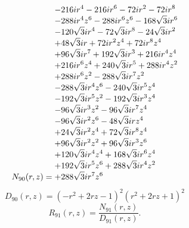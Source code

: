 \documentclass[11pt,a4paper]{article}
\begin{document}
\begin{equation}
N_{90}(r,z)=\shortstack[l]{$\displaystyle  - 216 i r^{4} - 216 i r^{6} - 72 i r^{2} - 72 i r^{8}$\\
$\displaystyle  - 288 i r^{4} z^{6} - 288 i r^{6} z^{6} - 168 \sqrt{3} i r^{6}$\\
$\displaystyle  - 120 \sqrt{3} i r^{4} - 72 \sqrt{3} i r^{8} - 24 \sqrt{3} i r^{2}$\\
$\displaystyle  + 48 \sqrt{3} i r + 72 i r^{2} z^{4} + 72 i r^{8} z^{4}$\\
$\displaystyle  + 96 \sqrt{3} i r^{7} + 192 \sqrt{3} i r^{3} + 216 i r^{4} z^{4}$\\
$\displaystyle  + 216 i r^{6} z^{4} + 240 \sqrt{3} i r^{5} + 288 i r^{4} z^{2}$\\
$\displaystyle  + 288 i r^{6} z^{2} - 288 \sqrt{3} i r^{7} z^{2}$\\
$\displaystyle  - 288 \sqrt{3} i r^{4} z^{6} - 240 \sqrt{3} i r^{5} z^{4}$\\
$\displaystyle  - 192 \sqrt{3} i r^{5} z^{2} - 192 \sqrt{3} i r^{3} z^{4}$\\
$\displaystyle  - 96 \sqrt{3} i r^{3} z^{2} - 96 \sqrt{3} i r^{7} z^{4}$\\
$\displaystyle  - 96 \sqrt{3} i r^{2} z^{6} - 48 \sqrt{3} i r z^{4}$\\
$\displaystyle  + 24 \sqrt{3} i r^{2} z^{4} + 72 \sqrt{3} i r^{8} z^{4}$\\
$\displaystyle  + 96 \sqrt{3} i r^{2} z^{2} + 96 \sqrt{3} i r^{3} z^{6}$\\
$\displaystyle  + 120 \sqrt{3} i r^{4} z^{4} + 168 \sqrt{3} i r^{6} z^{4}$\\
$\displaystyle  + 192 \sqrt{3} i r^{5} z^{6} + 288 \sqrt{3} i r^{4} z^{2}$\\
$\displaystyle  + 288 \sqrt{3} i r^{7} z^{6}$}
\label{eq:cat-numerator-90}
\end{equation}
\begin{equation}
D_{90}(r,z)=\left(- r^{2} + 2 r z - 1\right)^{2} \left(r^{2} + 2 r z + 1\right)^{2}
\label{eq:cat-denominator-90}
\end{equation}
\begin{equation}
R_{91}(r,z)=\frac{N_{91}(r,z)}{D_{91}(r,z)}.
\label{eq:cat-rational-91}
\end{equation}
\end{document}
